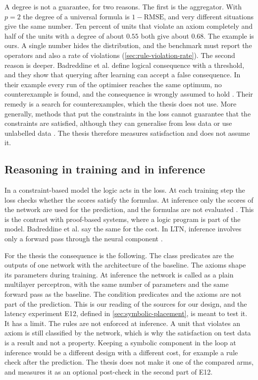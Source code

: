 A degree is not a guarantee, for two reasons. The first is the aggregator.
With $p=2$ the degree of a universal formula is $1-\mathrm{RMSE}$, and very
different situations give the same number. Ten percent of units that violate
an axiom completely and half of the units with a degree of about $0.55$ both
give about $0.68$. The example is ours. A single number hides the distribution,
and the benchmark must report the operators and also a rate of violations
(\cref{sec:rule-violation-rate}).
The second reason is deeper. Badreddine et al. define logical consequence with
a threshold, and they show that querying after learning can accept a false
consequence. In their example every run of the optimiser reaches the same
optimum, no counterexample is found, and the consequence is wrongly assumed to
hold \citep{badreddine2022ltn}. Their remedy is a search for counterexamples,
which the thesis does not use. More generally, methods that put the constraints
in the loss cannot guarantee that the constraints are satisfied, although they
can generalise from less data or use unlabelled data \citep{giunchiglia2022deep}.
The thesis therefore measures satisfaction and does not assume it.

\subsection{Reasoning in training and in inference}
\label{sec:inference-vs-training}

In a constraint-based model the logic acts in the loss. At each training step
the loss checks whether the scores satisfy the formulas. At inference only the
scores of the network are used for the prediction, and the formulas are not
evaluated \citep{marra2024statistical}. This is the contrast with proof-based
systems, where a logic program is part of the model. Badreddine et al. say the
same for the cost. In LTN, inference involves only a forward pass through the
neural component \citep{badreddine2022ltn}.

For the thesis the consequence is the following. The class predicates are the
outputs of one network with the architecture of the baseline. The axioms shape
its parameters during training. At inference the network is called as a plain
multilayer perceptron, with the same number of parameters and the same forward
pass as the baseline. The condition predicates and the axioms are not part of
the prediction. This is our reading of the sources for our design, and the
latency experiment E12, defined in \cref{sec:symbolic-placement}, is meant to test it.
It has a limit. The rules are not enforced at inference. A unit that violates
an axiom is still classified by the network, which is why the satisfaction on
test data is a result and not a property. Keeping a symbolic component in the
loop at inference would be a different design with a different cost, for
example a rule check after the prediction. The thesis does not make it one of
the compared arms, and measures it as an optional post-check in the second part
of E12.


